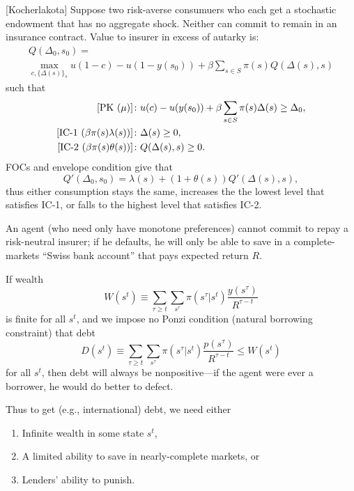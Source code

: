 \documentclass[8pt,letterpaper, landscape]{extarticle} %
\begin{document}
\begin{multicols}{3}
\begin{description}
 [Kocherlakota] Suppose two risk-averse consumuers who each get a stochastic endowment that has no aggregate shock. Neither can commit to remain in an insurance contract. Value to insurer in excess of autarky is:
\begin{multline*}
Q(\Delta_0 , s_0) = \\
 \max_{c, \{ \Delta (s) \}_s} u(1-c) - u(1 - y(s_0)) + \beta \sum_{s \in S} \pi (s) Q(\Delta (s) , s)
\end{multline*}
such that
\begin{align*}
\text{[PK ($ \mu $)]} &\colon u(c) - u(y(s_0)) + \beta \sum_{s \in S} \pi (s) \Delta (s) \geq \Delta_0,  \\
\text{[IC-1 ($ \beta \pi(s) \lambda (s) $)]} &\colon \Delta (s) \geq 0 ,\\
\text{[IC-2 ($ \beta \pi(s) \theta (s) $)]} &\colon Q(\Delta (s) , s) \geq 0 .\\
\end{align*}
FOCs and envelope condition give that
\[ Q' (\Delta_0 , s_0) = \lambda (s) + (1 + \theta (s)) Q' (\Delta (s) , s) , \]
thus either consumption stays the same, increases the the lowest level that satisfies IC-1, or falls to the highest level that satisfies IC-2.

 An agent (who need only have monotone preferences) cannot commit to repay a risk-neutral insurer; if he defaults, he will only be able to save in a complete-markets ``Swiss bank account'' that pays expected return $ R $.

If wealth
\[ W(s^t) \equiv \sum_{\tau \geq t} \sum_{s^\tau} \pi (s^\tau | s^t) \frac{y(s^\tau)}{R^{\tau - t}} \]
is finite for all $ s^t $, and we impose no Ponzi condition (natural borrowing constraint) that debt
$$ D (s^t) \equiv \sum_{\tau \geq t} \sum_{s^\tau} \pi (s^\tau | s^t) \frac{p(s^\tau)}{R^{\tau - t}} \leq W (s^t) $$
for all $ s^t $, then debt will always be nonpositive---if the agent were ever a borrower, he would do better to defect.

Thus to get (e.g., international) debt, we need either
\begin{enumerate}
\item Infinite wealth in some state $ s^t $,
\item A limited ability to save in nearly-complete markets, or
\item Lenders' ability to punish.
\end{enumerate}


\end{description}
\end{multicols}
\end{document}

